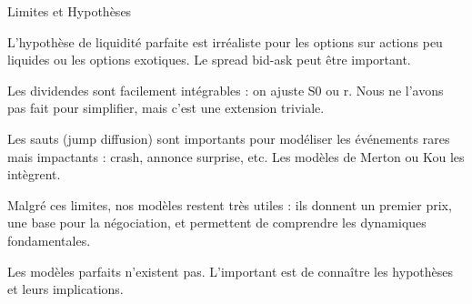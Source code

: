 \documentclass[aspectratio=169, 10pt]{beamer}
\begin{document}
\begin{frame}{Limites et Hypothèses}
{        L'hypothèse de liquidité parfaite est irréaliste pour les options
        sur actions peu liquides ou les options exotiques.
        Le spread bid-ask peut être important.
        
        Les dividendes sont facilement intégrables : on ajuste S0 ou r.
        Nous ne l'avons pas fait pour simplifier, mais c'est une extension triviale.
        
        Les sauts (jump diffusion) sont importants pour modéliser
        les événements rares mais impactants : crash, annonce surprise, etc.
        Les modèles de Merton ou Kou les intègrent.
        
        Malgré ces limites, nos modèles restent très utiles :
        ils donnent un premier prix, une base pour la négociation,
        et permettent de comprendre les dynamiques fondamentales.
        
        Les modèles parfaits n'existent pas. L'important est de connaître
        les hypothèses et leurs implications.
    }
\end{frame}
\end{document}
